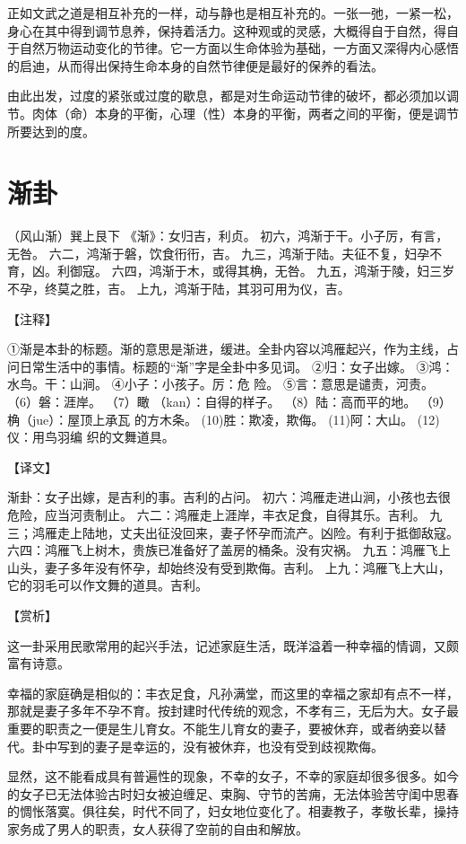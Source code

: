 \documentclass[12pt,UTF8]{ctexbook}
\begin{document}
正如文武之道是相互补充的一样，动与静也是相互补充的。一张一弛，一紧一松，身心在其中得到调节息养，保持着活力。这种观或的灵感，大概得自于自然，得自于自然万物运动变化的节律。它一方面以生命体验为基础，一方面又深得内心感悟的启迪，从而得出保持生命本身的自然节律便是最好的保养的看法。

由此出发，过度的紧张或过度的歇息，都是对生命运动节律的破坏，都必须加以调节。肉体（命）本身的平衡，心理（性）本身的平衡，两者之间的平衡，便是调节所要达到的度。

\chapter{渐卦}

（风山渐）巽上艮下
《渐》：女归吉，利贞。
初六，鸿渐于干。小子厉，有言，无咎。
六二，鸿渐于磐，饮食衎衎，吉。
九三，鸿渐于陆。夫征不复，妇孕不育，凶。利御寇。
六四，鸿渐于木，或得其桷，无咎。
九五，鸿渐于陵，妇三岁不孕，终莫之胜，吉。
上九，鸿渐于陆，其羽可用为仪，吉。

【注释】

①渐是本卦的标题。渐的意思是渐进，缓进。全卦内容以鸿雁起兴，作为主线，占问日常生活中的事情。标题的“渐”字是全卦中多见词。
②归：女子出嫁。
③鸿：水鸟。干：山涧。
④小子：小孩子。厉：危 险。
⑤言：意思是谴责，河责。
（6）磐：涯岸。
（7）瞰 （kan）：自得的样子。
（8）陆：高而平的地。
（9）桷（jue）：屋顶上承瓦 的方木条。
(10)胜：欺凌，欺侮。
(11)阿：大山。
(12)仪：用鸟羽编 织的文舞道具。

【译文】

渐卦：女子出嫁，是吉利的事。吉利的占问。
初六：鸿雁走进山涧，小孩也去很危险，应当河责制止。
六二：鸿雁走上涯岸，丰衣足食，自得其乐。吉利。
九三；鸿雁走上陆地，丈夫出征没回来，妻子怀孕而流产。凶险。有利于抵御敌寇。
六四：鸿雁飞上树木，贵族已准备好了盖房的桶条。没有灾祸。
九五：鸿雁飞上山头，妻子多年没有怀孕，却始终没有受到欺侮。吉利。
上九：鸿雁飞上大山，它的羽毛可以作文舞的道具。吉利。

【赏析】

这一卦采用民歌常用的起兴手法，记述家庭生活，既洋溢着一种幸福的情调，又颇富有诗意。

幸福的家庭确是相似的：丰衣足食，凡孙满堂，而这里的幸福之家却有点不一样，那就是妻子多年不孕不育。按封建时代传统的观念，不孝有三，无后为大。女子最重要的职责之一便是生儿育女。不能生儿育女的妻子，要被休弃，或者纳妾以替代。卦中写到的妻子是幸运的，没有被休弃，也没有受到歧视欺侮。

显然，这不能看成具有普遍性的现象，不幸的女子，不幸的家庭却很多很多。如今的女子已无法体验古时妇女被迫缠足、束胸、守节的苦痈，无法体验苦守闺中思春的惆怅落寞。俱往矣，时代不同了，妇女地位变化了。相妻教子，孝敬长辈，操持家务成了男人的职责，女人获得了空前的自由和解放。
\end{document}
